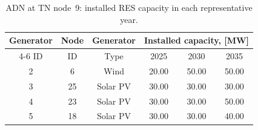 \begin{table}[htbp!]
    \centering
    \caption{ADN at TN node~9: installed RES capacity in each representative year.}
    \begin{tabular}{ccc ccc}
        \toprule
        Generator   & Node  & Generator & \multicolumn{3}{c}{Installed capacity, [MW]}\\  \cmidrule{4-6}
        ID          & ID    & Type      & 2025 & 2030 & 2035 \\ 
        \midrule
        2 & 6 & Wind & 20.00 & 50.00 & 50.00\\
        3 & 25 & Solar PV & 30.00 & 30.00 & 30.00\\
        4 & 23 & Solar PV & 30.00 & 30.00 & 50.00\\
        5 & 18 & Solar PV & 30.00 & 30.00 & 40.00\\
        \bottomrule
    \end{tabular}
    \label{tab:cs3_adn_node_9_res_generators}
\end{table}
